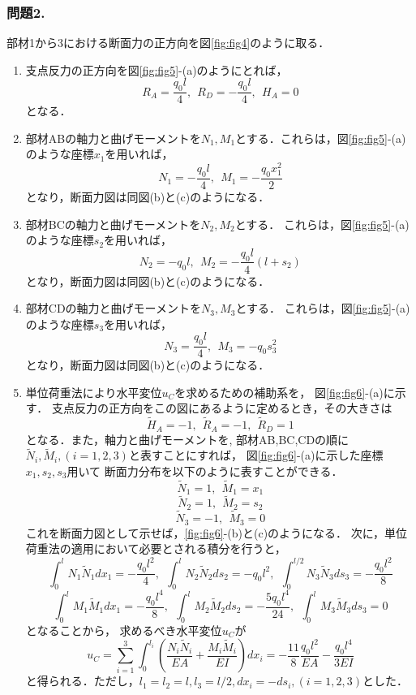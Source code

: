 \documentclass[10pt,a4j]{jarticle}
\begin{document}
\subsubsection*{問題2.}
部材1から3における断面力の正方向を図\ref{fig:fig4}のように取る．
\begin{enumerate}
\item
	支点反力の正方向を図\ref{fig:fig5}-(a)のようにとれば，
	\[
		R_A=\frac{q_0l}{4}, \ \ R_D=-\frac{q_0l}{4}, \ \ H_A=0
	\]
	となる．
\item
	部材ABの軸力と曲げモーメントを$N_1,M_1$とする．これらは，図\ref{fig:fig5}-(a)
	のような座標$x_1$を用いれば，
	\[
		N_1=-\frac{q_0l}{4}, \ \ M_1=-\frac{q_0x_1^2}{2}
	\]
	となり，断面力図は同図(b)と(c)のようになる．
\item
	部材BCの軸力と曲げモーメントを$N_2,M_2$とする．
	これらは，図\ref{fig:fig5}-(a)のような座標$s_2$を用いれば，
	\[ 
		N_2=-q_0l, \ \ M_2=-\frac{q_0l}{4}(l+s_2)
	\]
	となり，断面力図は同図(b)と(c)のようになる．
\item
	部材CDの軸力と曲げモーメントを$N_3,M_3$とする．
	これらは，図\ref{fig:fig5}-(a)のような座標$s_3$を用いれば，
	\[ 
		N_3=\frac{q_0l}{4}, \ \ M_3=-q_0s_3^2
	\]
	となり，断面力図は同図(b)と(c)のようになる．
\item
	単位荷重法により水平変位$u_C$を求めるための補助系を，
	図\ref{fig:fig6}-(a)に示す．
	支点反力の正方向をこの図にあるように定めるとき，その大きさは
	\[
		\tilde H_A=-1, \ \ \tilde R_A=-1, \ \  \tilde R_D=1
	\]
	となる．また，軸力と曲げモーメントを, 部材AB,BC,CDの順に
	$\tilde N_i, \tilde M_i,(i=1,2,3)$と表すことにすれば，
	図\ref{fig:fig6}-(a)に示した座標$x_1,s_2,s_3$用いて
	断面力分布を以下のように表すことができる．
	\[
		\tilde N_1=1, \ \ \tilde M_1=x_1
	\]
	\[
		\tilde N_2=1, \ \ \tilde M_2=s_2
	\]
	\[
		\tilde N_3=-1, \ \ \tilde M_3=0
	\]
	これを断面力図として示せば，\ref{fig:fig6}-(b)と(c)のようになる．
	次に，単位荷重法の適用において必要とされる積分を行うと，
	\[
		\int _0^l N_1\tilde N_1dx_1=-\frac{q_0l^2}{4}, \ \ 
		\int _0^l N_2\tilde N_2ds_2=-q_0l^2, \ \ 
		\int _0^{l/2} N_3\tilde N_3ds_3=-\frac{q_0l^2}{8} 
	\]
	\[
		\int_0^l M_1\tilde M_1dx_1=-\frac{q_0l^4}{8}, \ \ 
		\int_0^l M_2\tilde M_2ds_2=-\frac{5q_0l^4}{24},\ \ 
		\int_0^l M_3\tilde M_3ds_3=0
	\]
	となることから，
	求めるべき水平変位$u_C$が
	\[
		u_C=
		\sum_{i=1}^3 \int_0^{l_i}
		\left(
		\frac{N_i\tilde N_i}{EA}+\frac{M_i\tilde M_i}{EI}
		\right)dx_i
		=
		-\frac{11}{8}
		\frac{q_0l^2}{EA}
		-
		\frac{q_0l^4}{3EI}
	\]
	と得られる．ただし，$l_1=l_2=l, l_3=l/2, dx_i=-ds_i,(i=1,2,3) $とした．
\end{enumerate}
\end{document}
